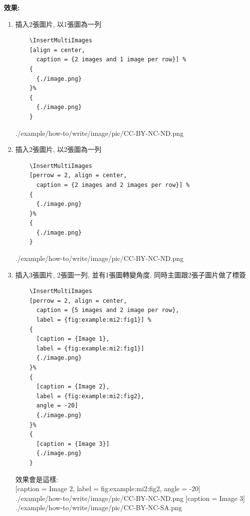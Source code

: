   {\bf 效果:}
  \begin{enumerate}
  \item
  {
    插入2張圖片, 以1張圖為一列
    \begin{verbatim}
    \InsertMultiImages
    [align = center,
      caption = {2 images and 1 image per row}] %
    {
      {./image.png}
    }%
    {
      {./image.png}
    }
    \end{verbatim}
    {
      {./example/how-to/write/image/pic/CC-BY-NC-ND.png}
    }
  } %

  \item
  {
    插入2張圖片, 以2張圖為一列
    \begin{verbatim}
    \InsertMultiImages
    [perrow = 2, align = center,
      caption = {2 images and 2 images per row}] %
    {
      {./image.png}
    }%
    {
      {./image.png}
    }
    \end{verbatim}
    {
      {./example/how-to/write/image/pic/CC-BY-NC-ND.png}
    }
  } %

  \newpage
  \item
  {
    插入3張圖片, 2張圖一列, 並有1張圖轉變角度, 同時主圖跟2張子圖片做了標簽
    \begin{verbatim}
    \InsertMultiImages
    [perrow = 2, align = center,
      caption = {5 images and 2 image per row},
      label = {fig:example:mi2:fig1}] %
    {
      [caption = {Image 1},
      label = {fig:example:mi2:fig1}]
      {./image.png}
    }%
    {
      [caption = {Image 2},
      label = {fig:example:mi2:fig2},
      angle = -20]
      {./image.png}
    }%
    {
      [caption = {Image 3}]
      {./image.png}
    }
    \end{verbatim}

    效果會是這樣: \\
    {
      [caption = {Image 2},
      label = {fig:example:mi2:fig2},
      angle = -20]
      {./example/how-to/write/image/pic/CC-BY-NC-ND.png}
    }%
    {
      [caption = {Image 3}]
      {./example/how-to/write/image/pic/CC-BY-NC-SA.png}
    }

}
\end{enumerate}
